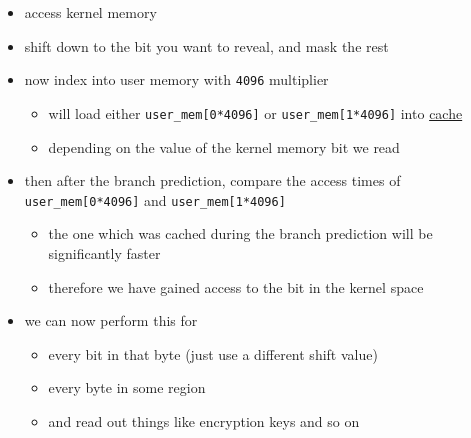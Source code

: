 \begin{itemize}
\tightlist
\item
  access kernel memory
\item
  shift down to the bit you want to reveal, and mask the rest
\item
  now index into user memory with \texttt{4096} multiplier

  \begin{itemize}
  \tightlist
  \item
    will load either \texttt{user\_mem{[}0*4096{]}} or
    \texttt{user\_mem{[}1*4096{]}} into \ul{cache}
  \item
    depending on the value of the kernel memory bit we read
  \end{itemize}
\item
  then after the branch prediction, compare the access times of
  \texttt{user\_mem{[}0*4096{]}} and \texttt{user\_mem{[}1*4096{]}}

  \begin{itemize}
  \tightlist
  \item
    the one which was cached during the branch prediction will be
    significantly faster
  \item
    therefore we have gained access to the bit in the kernel space
  \end{itemize}
\item
  we can now perform this for

  \begin{itemize}
  \tightlist
  \item
    every bit in that byte (just use a different shift value)
  \item
    every byte in some region
  \item
    and read out things like encryption keys and so on
  \end{itemize}
\end{itemize}
